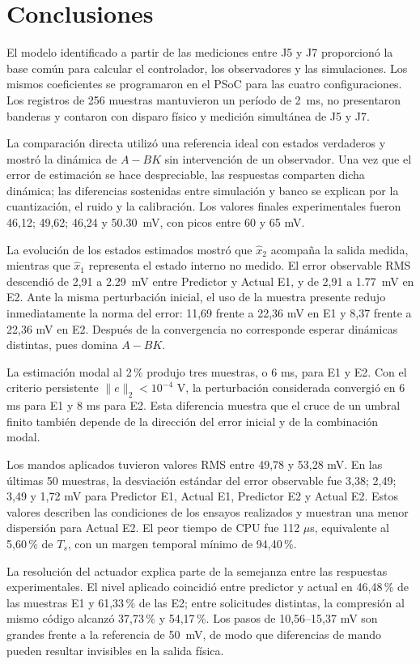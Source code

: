 \section{Conclusiones}
El modelo identificado a partir de las mediciones entre J5 y J7 proporcionó la
base común para calcular el controlador, los observadores y las simulaciones.
Los mismos coeficientes se programaron en el PSoC para las cuatro
configuraciones. Los registros de 256 muestras mantuvieron un período de
\SI{2}{\milli\second}, no presentaron banderas y contaron con disparo físico y
medición simultánea de J5 y J7.

La comparación directa utilizó una referencia ideal con estados verdaderos y
mostró la dinámica de $A-BK$ sin intervención de un observador. Una vez que el
error de estimación se hace despreciable, las respuestas comparten dicha
dinámica; las diferencias sostenidas entre simulación y banco se explican por
la cuantización, el ruido y la calibración. Los valores finales experimentales
fueron 46,12; 49,62; 46,24 y \SI{50.30}{\milli\volt}, con picos entre 60 y
65 mV.

La evolución de los estados estimados mostró que $\hat x_2$ acompaña la salida
medida, mientras que $\hat x_1$ representa el estado interno no medido. El error
observable RMS descendió de 2,91 a \SI{2.29}{\milli\volt} entre Predictor y
Actual E1, y de 2,91 a \SI{1.77}{\milli\volt} en E2. Ante la misma perturbación
inicial, el uso de la muestra presente redujo inmediatamente la norma del error:
11,69 frente a 22,36 mV en E1 y 8,37 frente a 22,36 mV en E2. Después de la
convergencia no corresponde esperar dinámicas distintas, pues domina $A-BK$.

La estimación modal al 2\,\% produjo tres muestras, o 6 ms, para E1 y E2. Con
el criterio persistente $\|e\|_2<10^{-4}$ V, la perturbación considerada
convergió en 6 ms para E1 y 8 ms para E2. Esta diferencia muestra que el cruce
de un umbral finito también depende de la dirección del error inicial y de la
combinación modal.

Los mandos aplicados tuvieron valores RMS entre 49,78 y 53,28 mV. En las
últimas 50 muestras, la desviación estándar del error observable fue 3,38;
2,49; 3,49 y 1,72 mV para Predictor E1, Actual E1, Predictor E2 y Actual E2.
Estos valores describen las condiciones de los ensayos realizados y muestran
una menor dispersión para Actual E2. El peor tiempo de CPU fue 112 $\mu$s,
equivalente al 5,60\,\% de $T_s$, con un margen temporal mínimo de 94,40\,\%.

La resolución del actuador explica parte de la semejanza entre las respuestas
experimentales. El nivel aplicado coincidió entre predictor y actual en
46,48\,\% de las muestras E1 y 61,33\,\% de las E2; entre solicitudes distintas,
la compresión al mismo código alcanzó 37,73\,\% y 54,17\,\%. Los pasos de
10,56--15,37 mV son grandes frente a la referencia de
\SI{50}{\milli\volt}, de modo que diferencias de mando pueden resultar
invisibles en la salida física.
